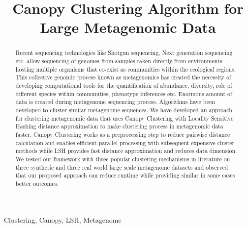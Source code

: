 \documentclass[10pt, conference, compsocconf]{IEEEtran}
\begin{document}
\title{Canopy Clustering Algorithm for Large Metagenomic Data}

\author{
}
\maketitle

\begin{abstract}

Recent sequencing technologies like Shotgun sequencing, Next generation sequencing etc. allow sequencing of genomes from samples taken directly from environments hosting multiple organisms that co-exist as communities within the ecological regions. This collective genomic process known as metagenomics has created the necessity of developing computational tools for the quantification of abundance, diversity, role of different species within communities, phenotype inferences etc. Enormous amount of data is created during metagenome sequencing process. Algorithms have been developed to cluster similar metagenome sequences. We have developed an approach for clustering metagenomic data that uses Canopy Clustering with Locality Sensitive Hashing distance approximation to make clustering process in metagenomic data faster. Canopy Clustering works as a preprocessing step to reduce pairwise distance calculation and enables efficient parallel processing with subsequent expensive cluster methods while LSH provides fast distance approximation and reduces data dimension. We tested our framework with three popular clustering mechanisms in literature on three synthetic and three real world large scale metagenome datasets and observed that our proposed approach can reduce runtime while providing similar in some cases better outcomes.

\end{abstract}

\begin{IEEEkeywords}
Clustering, Canopy, LSH, Metagenome
\end{IEEEkeywords}

%
\IEEEpeerreviewmaketitle
\end{document}
